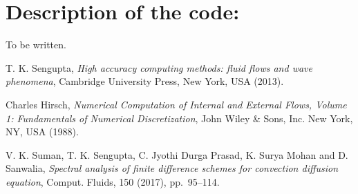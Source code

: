 \documentclass[fleqn]{article}
\begin{document}
\section{Description of the code:}
To be written.


\begin{thebibliography}{1}

        {\sc T. K. Sengupta}, {\em High accuracy computing methods: fluid flows and wave phenomena}, Cambridge University Press, New York, USA (2013).

        {\sc Charles Hirsch}, {\em Numerical Computation of Internal and External Flows, Volume 1: Fundamentals of Numerical Discretization}, John Wiley \& Sons, Inc. New York, NY, USA (1988).

        {\sc V. K. Suman, T. K. Sengupta, C. Jyothi Durga Prasad, K. Surya Mohan and D. Sanwalia}, {\em Spectral analysis of finite difference schemes for convection diffusion equation}, Comput. Fluids, 150 (2017), pp.~95--114.     
        
\end{thebibliography}
\end{document}
